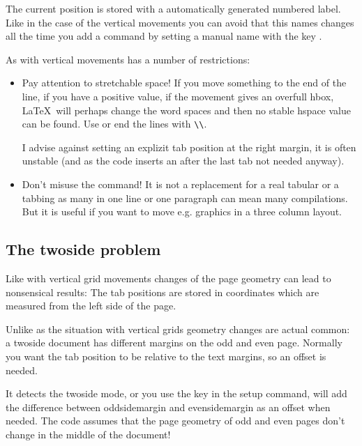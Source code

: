 \documentclass[twoside,parskip=half-,fontsize=12pt,egregdoesnotlikesansseriftitles,headings=normal]{scrartcl}
\begin{document}
The current position is stored with a automatically generated numbered label. Like in the case of the vertical movements you can avoid that this names changes all the time you add a command by setting a manual name with the key .

As with vertical movements  has a number of restrictions:

\begin{itemize}
\item Pay attention to stretchable space! If you move something to the end of the line, if you have a positive  value, if the movement gives an overfull hbox, \LaTeX\ will perhaps change the word spaces and then no stable hspace value can be found.  Use  or end the lines with \verb+\\+.

    I advise against setting an explizit tab position at the right margin, it is often unstable (and as the code inserts an  after the last tab not needed anyway).


\item Don't misuse the command! It is not a replacement for a real tabular or a tabbing as many  in one line or one paragraph can mean many compilations. But it is useful if you want to move e.g. graphics in a three column layout.
\end{itemize}

\subsection{The twoside problem}\label{sec:twoside}

Like with vertical grid movements changes of the page geometry can lead to nonsensical results: The tab positions are stored in coordinates which are measured from the left side of the page. 

Unlike as the situation with vertical grids geometry changes are actual common:  a twoside document has different margins on the odd and even page. Normally you want the tab position to be relative to the text margins, so an offset is needed. 

It  detects the twoside mode, or you use the  key in the setup command,  will add the difference between oddsidemargin and evensidemargin as an offset when needed. The code assumes that the page geometry of odd and even pages don't change in the middle of the document!
\end{document}

